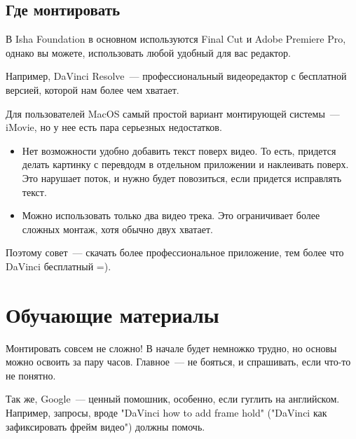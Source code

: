 \documentclass[
a4paper, %
12pt, %
article,
onecolumn, %
openany, %
]{memoir}
\begin{document}
\subsection{Где монтировать}
В Isha Foundation в основном используются Final Cut и Adobe Premiere Pro,
однако вы можете, использовать любой удобный для вас редактор.

Например, DaVinci Resolve~---
профессиональный видеоредактор с бесплатной версией, которой нам более чем хватает.

Для пользователей MacOS самый простой вариант монтирующей системы~---
iMovie, но у нее есть пара серьезных недостатков.
\begin{itemize}
  \item Нет возможности удобно добавить текст поверх видео.
        То есть, придется делать
        картинку с перевдодм в отдельном приложении и наклеивать поверх.
        Это нарушает поток, и нужно будет повозиться, если придется исправлять текст.
  \item Можно использовать только два видео трека. Это ограничивает более
        сложных монтаж, хотя обычно двух хватает.
\end{itemize}
Поэтому совет~--- скачать более профессиональное приложение, тем более что
DaVinci бесплатный =).




\newpage
\section{Обучающие материалы}

Монтировать совсем не сложно! В начале будет немножко трудно, но основы можно
освоить за пару часов. Главное~--- не бояться, и спрашивать, если что-то не понятно.

Так же, Google~--- ценный помошник, особенно, если гуглить на английском.
Например, запросы, вроде
"DaVinci how to add frame hold" ("DaVinci как зафиксировать фрейм видео")
должны помочь.
\end{document}
